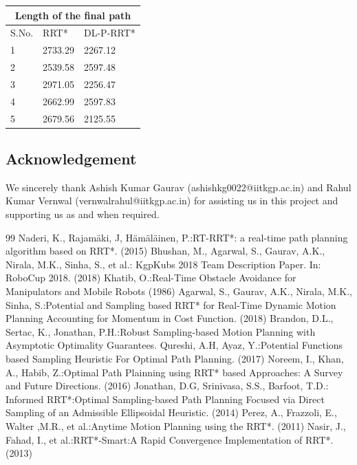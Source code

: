 \documentclass[runningheads]{llncs}
\begin{document}
\vspace{2.5mm}
\begin{center}
\begin{tabular}{ |p{1cm}||p{2.5cm}|p{2.5cm}|  }
 \hline
 \multicolumn{3}{|c|}{Length of the final path} \\
 \hline
 S.No. & RRT* &DL-P-RRT*\\
 \hline
 1  &2733.29 &2267.12\\
 2  &2539.58 &2597.48\\
 3  &2971.05 &2256.47\\
 4  &2662.99 & 2597.83\\
 5  &2679.56 &2125.55\\

 \hline
\end{tabular}
\end{center}



\subsection*{Acknowledgement}
We sincerely thank Ashish Kumar Gaurav (ashishkg0022@iitkgp.ac.in) and Rahul Kumar Vernwal (vernwalrahul@iitkgp.ac.in) for assisting us in this project and supporting us as and when required.

\begin{thebibliography}{99}
Naderi, K., Rajamäki, J, Hämäläinen, P.:RT-RRT*: a real-time path planning algorithm based on RRT*. (2015)
Bhushan, M., Agarwal, S., Gaurav, A.K., Nirala, M.K., Sinha, S., et al.: KgpKubs 2018 Team Description Paper. In: RoboCup 2018. (2018)
Khatib, O.:Real-Time Obstacle Avoidance for Manipulators and Mobile Robots (1986)
Agarwal, S., Gaurav, A.K., Nirala, M.K., Sinha, S.:Potential and Sampling based RRT* for Real-Time Dynamic Motion Planning Accounting for Momentum in Cost Function. (2018)
Brandon, D.L., Sertac, K., Jonathan, P.H.:Robust Sampling-based Motion Planning with Asymptotic Optimality Guarantees.
Qureshi, A.H, Ayaz, Y.:Potential Functions based Sampling Heuristic For Optimal Path Planning. (2017)
Noreem, I., Khan, A., Habib, Z.:Optimal Path Plainning using RRT* based Approaches: A Survey and Future Directions. (2016)
Jonathan, D.G, Srinivasa, S.S., Barfoot, T.D.: Informed RRT*:Optimal Sampling-based Path Planning Focused via Direct Sampling of an Admissible Ellipsoidal Heuristic. (2014)
Perez, A., Frazzoli, E., Walter ,M.R., et al.:Anytime Motion Planning using the RRT*. (2011)
Nasir, J., Fahad, I., et al.:RRT*-Smart:A Rapid Convergence Implementation of RRT*. (2013)

\end{thebibliography}
\end{document}
